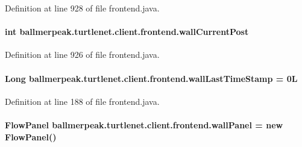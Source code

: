 Definition at line 928 of file frontend.\-java.

\hypertarget{classballmerpeak_1_1turtlenet_1_1client_1_1frontend_a1b40bc19faaffa4cb67380121d04b980}{
\paragraph[{wall\-Current\-Post}]{\setlength{\rightskip}{0pt plus 5cm}int ballmerpeak.\-turtlenet.\-client.\-frontend.\-wall\-Current\-Post\hspace{0.3cm}{\ttfamily [package]}}}\label{classballmerpeak_1_1turtlenet_1_1client_1_1frontend_a1b40bc19faaffa4cb67380121d04b980}


Definition at line 926 of file frontend.\-java.

\hypertarget{classballmerpeak_1_1turtlenet_1_1client_1_1frontend_a0ae0ed364ab749ea18cf1e45d64e1db7}{
\paragraph[{wall\-Last\-Time\-Stamp}]{\setlength{\rightskip}{0pt plus 5cm}Long ballmerpeak.\-turtlenet.\-client.\-frontend.\-wall\-Last\-Time\-Stamp = 0\-L\hspace{0.3cm}{\ttfamily [package]}}}\label{classballmerpeak_1_1turtlenet_1_1client_1_1frontend_a0ae0ed364ab749ea18cf1e45d64e1db7}


Definition at line 188 of file frontend.\-java.

\hypertarget{classballmerpeak_1_1turtlenet_1_1client_1_1frontend_aabfe3b109c5a81d51ede885f008d7530}{
\paragraph[{wall\-Panel}]{\setlength{\rightskip}{0pt plus 5cm}Flow\-Panel ballmerpeak.\-turtlenet.\-client.\-frontend.\-wall\-Panel = new Flow\-Panel()\hspace{0.3cm}{\ttfamily [private]}}}\label{classballmerpeak_1_1turtlenet_1_1client_1_1frontend_aabfe3b109c5a81d51ede885f008d7530}


